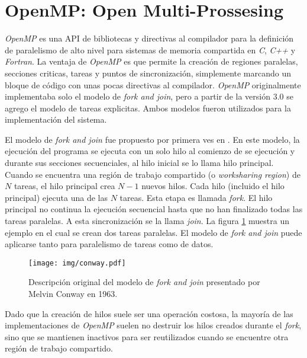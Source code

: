 
\section{OpenMP: Open Multi-Prossesing}

\emph{OpenMP} es una API de bibliotecas y directivas al compilador para la
definición de paralelismo de alto nivel para sistemas de memoria compartida en
\emph{C}, \emph{C++} y \emph{Fortran}\cite{ompWeb}. La ventaja de \emph{OpenMP}
es que permite la creación de regiones paralelas, secciones criticas, tareas y
puntos de sincronización, simplemente marcando un bloque de código con unas
pocas directivas al compilador. \emph{OpenMP} originalmente implementaba solo el
modelo de \emph{fork and join}, pero a partir de la versión $3.0$ se agrego el
modelo de tareas explicitas\cite{openmp08}. Ambos modelos fueron utilizados para
la implementación del sistema.

El modelo de \emph{fork and join} fue propuesto por primera ves en
\cite{conway1963}. En este modelo, la ejecución del programa se ejecuta con un
solo hilo al comienzo de se ejecución y durante sus secciones secuenciales, al
hilo inicial se lo llama hilo principal. Cuando se encuentra una región de
trabajo compartido (o \emph{worksharing region}) de $N$ tareas, el hilo
principal crea $N-1$ nuevos hilos. Cada hilo (incluido el hilo principal)
ejecuta una de las $N$ tareas. Esta etapa es llamada \emph{fork}. El hilo
principal no continua la ejecución secuencial hasta que no han finalizado todas
las tareas paralelas. A esta sincronización se la llama \emph{join}. La figura
\ref{conway} muestra un ejemplo en el cual se crean dos tareas paralelas. El
modelo de \emph{fork and join} puede aplicarse tanto para paralelismo de tareas
como de datos. 

\begin{figure}[!h]

	\centering

	\texttt{[image: img/conway.pdf]}

	\caption{Descripción original del modelo de \emph{fork and join}
	presentado por Melvin Conway en 1963\cite{conway1963}.}

	\label{conway}

\end{figure}

Dado que la creación de hilos suele ser una operación costosa, la mayoría de las
implementaciones de \emph{OpenMP} suelen no destruir los hilos creados durante
el \emph{fork}, sino que se mantienen inactivos para ser reutilizados cuando se
encuentre otra región de trabajo compartido.

